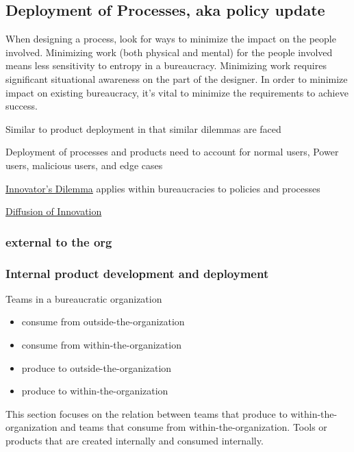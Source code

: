 \subsection{Deployment of Processes, aka policy update}

When designing a process, look for ways to minimize the impact on the people involved. Minimizing work (both physical and mental) for the people involved means less sensitivity to entropy in a bureaucracy. Minimizing work requires significant situational awareness on the part of the designer. In order to minimize impact on existing bureaucracy, it's vital to minimize the requirements to achieve success.


Similar to product deployment in that similar dilemmas are faced

Deployment of processes and products need to account for 
normal users, Power users, malicious users, and edge cases

\href{https://en.m.wikipedia.org/wiki/The_Innovator's_Dilemma}{Innovator's Dilemma} applies within bureaucracies to policies and processes

\href{https://en.wikipedia.org/wiki/Diffusion_of_innovations}{Diffusion of Innovation}

\subsubsection{external to the org}


\subsubsection{Internal product development and deployment\label{sec:internal_product}}

Teams in a bureaucratic organization 
\begin{itemize}
    \item consume from outside-the-organization
    \item consume from within-the-organization
    \item produce to outside-the-organization
    \item produce to within-the-organization
\end{itemize}

This section focuses on the relation between teams that produce to within-the-organization and teams that consume from within-the-organization. Tools or products that are created internally and consumed internally.

